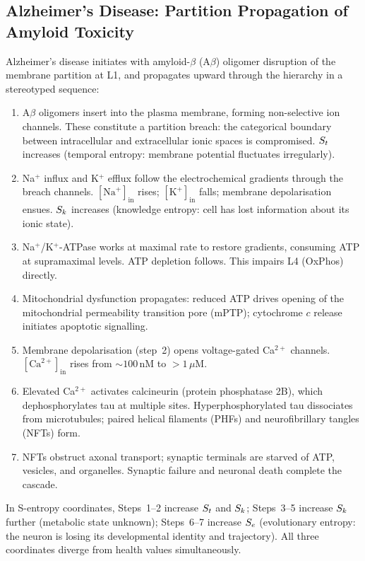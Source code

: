 \subsection{Alzheimer's Disease: Partition Propagation of Amyloid Toxicity}

\begin{theorem}
\label{thm:alzheimer_cascade}
Alzheimer's disease initiates with amyloid-$\beta$ (A$\beta$) oligomer
disruption of the membrane partition at L1, and propagates upward through the
hierarchy in a stereotyped sequence:
\begin{enumerate}[label=\textup{Step \arabic*.}]
  \item A$\beta$ oligomers insert into the plasma membrane, forming
        non-selective ion channels. These constitute a partition breach:
        the categorical boundary between intracellular and extracellular ionic
        spaces is compromised. $S_t$ increases (temporal entropy: membrane
        potential fluctuates irregularly).
  \item Na$^+$ influx and K$^+$ efflux follow the electrochemical gradients
        through the breach channels. $[\mathrm{Na}^+]_{\mathrm{in}}$ rises;
        $[\mathrm{K}^+]_{\mathrm{in}}$ falls; membrane depolarisation
        ensues. $S_k$ increases (knowledge entropy: cell has lost information
        about its ionic state).
  \item Na$^+$/K$^+$-ATPase works at maximal rate to restore gradients,
        consuming ATP at supramaximal levels. ATP depletion follows.
        This impairs L4 (OxPhos) directly.
  \item Mitochondrial dysfunction propagates: reduced ATP drives opening of
        the mitochondrial permeability transition pore (mPTP); cytochrome $c$
        release initiates apoptotic signalling.
  \item Membrane depolarisation (step~2) opens voltage-gated Ca$^{2+}$
        channels. $[\mathrm{Ca}^{2+}]_{\mathrm{in}}$ rises from
        $\sim 100\,\mathrm{nM}$ to $>1\,\mu\mathrm{M}$.
  \item Elevated Ca$^{2+}$ activates calcineurin (protein phosphatase 2B),
        which dephosphorylates tau at multiple sites. Hyperphosphorylated tau
        dissociates from microtubules; paired helical filaments (PHFs) and
        neurofibrillary tangles (NFTs) form.
  \item NFTs obstruct axonal transport; synaptic terminals are starved of
        ATP, vesicles, and organelles. Synaptic failure and neuronal death
        complete the cascade.
\end{enumerate}
In S-entropy coordinates, Steps~1--2 increase $S_t$ and $S_k$; Steps~3--5
increase $S_k$ further (metabolic state unknown); Steps~6--7 increase $S_e$
(evolutionary entropy: the neuron is losing its developmental identity and
trajectory). All three coordinates diverge from health values simultaneously.
\end{theorem}

